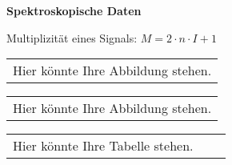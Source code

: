 \documentclass[./main.tex]{subfiles}
\begin{document}
{\centering\large\bfseries Spektroskopische Daten\par}

Multiplizit\"at eines Signals: $M = 2\cdot n\cdot I +1$\par

\begin{formulabox}
  \begin{center}
  \renewcommand{\arraystretch}{1.4}
    \begin{tabular}{c}
        Hier k\"onnte Ihre Abbildung stehen.
    \end{tabular}
  \end{center}
\end{formulabox}

\begin{formulabox}
  \begin{center}
  \renewcommand{\arraystretch}{1.4}
    \begin{tabular}{c}
        Hier k\"onnte Ihre Abbildung stehen.
    \end{tabular}
  \end{center}
\end{formulabox}

\begin{formulabox}
  \begin{center}
  \renewcommand{\arraystretch}{1.4}
    \begin{tabular}{>{\raggedleft\arraybackslash}p{} p{}p{}}
        Hier k\"onnte Ihre Tabelle stehen.
    \end{tabular}
  \end{center}
\end{formulabox}

\newpage
\end{document}

